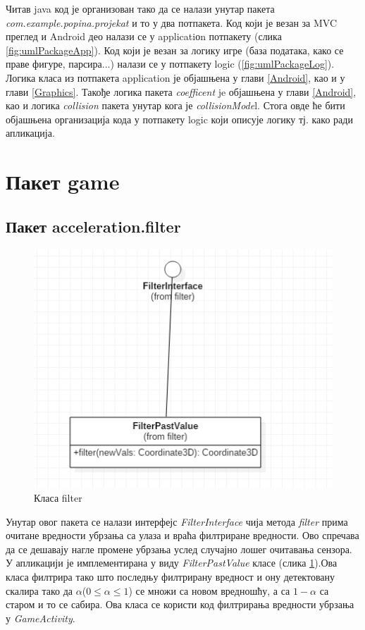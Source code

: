Читав java код је организован тако да се налази унутар пакета \emph{com.example.popina.projekat} и то у два потпакета. Код који је везан за MVC преглед и Android део налази се у applicatiоn потпакету (слика \ref{fig:umlPackageApp}). Код који је везан за логику игре (база података, како се праве фигуре, парсира...) налази се у потпакету logic (\ref{fig:umlPackageLog}). Логика класа из потпакета application је објашњена у глави \ref{Android}, као и у глави \ref{Graphics}. Такође логика пакета \emph{coefficent} je објашњена у глави  \ref{Android}, као и логика \emph{collision} пакета унутар кога је \emph{collisionMode}l. Стога овде ће бити објашњена организација кода у потпакету logic који описује логику тј. како ради апликација. 

\section{Пакет game}
\subsection{Пакет acceleration.filter}

\begin{figure}[htb!]
\begin{center}
\includegraphics[scale=.6]{pictures/UML/class/filter}
\caption{Класа filter}\label{fig:umlClassFilter}
\end{center}
\end{figure}

Унутар овог пакета се налази интерфејс \emph{FilterInterface} чија метода \emph{filter} прима очитане вредности убрзања са улаза и враћа филтриране вредности. Ово спречава да се дешавају нагле промене убрзања услед случајно лошег очитавања сензора. У апликацији је имплементирана у виду \emph{FilterPastValue} класе (слика \ref{fig:umlClassFilter}).Ова класа филтрира тако што последњу филтрирану вредност и ону детектовану скалира тако да $\alpha$($0 \leq \alpha \leq 1$) се множи са новом вредношћу, а са $1-\alpha$ са старом и то се сабира. Ова класа се користи код филтрирања вредности убрзања у \emph{GameActivity}. 

